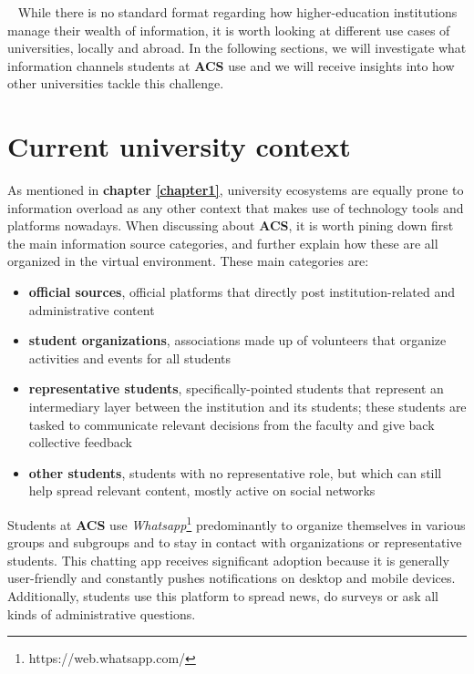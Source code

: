 ~
While there is no standard format regarding how higher-education institutions manage their wealth of information, it is worth looking at different use cases of universities, locally and abroad. In the following sections, we will investigate what information channels students at \textbf{ACS} use and we will receive insights into how other universities tackle this challenge.

\section{Current university context} \label{2:present_situation}

As mentioned in \textbf{chapter \ref{chapter1}}, university ecosystems are equally prone to information overload as any other context that makes use of technology tools and platforms nowadays. When discussing about \textbf{ACS}, it is worth pining down first the main information source categories, and further explain how these are all organized in the virtual environment. These main categories are:

\begin{itemize}
    \setlength{\topsep}{0.5pt}
    \setlength{\itemsep}{0.5pt}
    \setlength{\parsep}{0.5pt}
    \item \textbf{official sources}, official platforms that directly post institution-related and administrative content
    \item \textbf{student organizations}, associations made up of volunteers that organize activities and events for all students
    \item \textbf{representative students}, specifically-pointed students that represent an intermediary layer between the institution and its students; these students are tasked to communicate relevant decisions from the faculty and give back collective feedback
    \item \textbf{other students}, students with no representative role, but which can still help spread relevant content, mostly active on social networks
\end{itemize}

Students at \textbf{ACS} use \textit{Whatsapp}\footnote{https://web.whatsapp.com/} predominantly to organize themselves in various groups and subgroups and to stay in contact with organizations or representative students. This chatting app receives significant adoption because it is generally user-friendly and constantly pushes notifications on desktop and mobile devices. Additionally, students use this platform to spread news, do surveys or ask all kinds of administrative questions.

